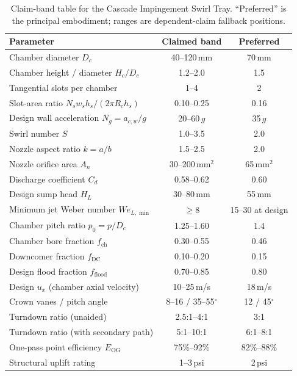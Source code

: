 \documentclass[11pt,letterpaper]{article}
\newcommand{\ux}{u_{x}}
\newcommand{\Eog}{E_{\mathrm{OG}}}
\newcommand{\Rc}{R_c}
\newcommand{\Hc}{H_c}
\newcommand{\Dc}{D_c}
\newcommand{\We}{\mathit{We}}
\begin{document}
\begin{table}[H]
\centering
\caption{Claim-band table for the Cascade Impingement Swirl Tray.
  ``Preferred'' is the principal embodiment; ranges are dependent-claim
  fallback positions.}
\label{tab:claimband}
\small
\begin{tabular}{lcc}
\toprule
Parameter & Claimed band & Preferred\\
\midrule
Chamber diameter $\Dc$              & 40--120\,mm        & 70\,mm\\
Chamber height / diameter $\Hc/\Dc$ & 1.2--2.0           & 1.5\\
Tangential slots per chamber        & 1--4               & 2\\
Slot-area ratio $N_s w_s h_s / (2\pi\Rc h_s)$ & 0.10--0.25 & 0.16\\
Design wall acceleration $N_g = a_{c,w}/g$      & 20--60\,$g$ & 35\,$g$\\
Swirl number $S$                    & 1.0--3.5           & 2.0\\
Nozzle aspect ratio $k = a/b$       & 1.5--2.5           & 2.0\\
Nozzle orifice area $A_n$           & 30--200\,mm$^2$    & 65\,mm$^2$\\
Discharge coefficient $C_d$         & 0.58--0.62         & 0.60\\
Design sump head $H_L$              & 30--80\,mm         & 55\,mm\\
Minimum jet Weber number $\We_{L,\min}$ & $\geq 8$      & 15--30 at design\\
Chamber pitch ratio $p_0 = p/\Dc$   & 1.25--1.60         & 1.4\\
Chamber bore fraction $f_{\mathrm{ch}}$ & 0.30--0.55  & 0.46\\
Downcomer fraction $f_{\mathrm{DC}}$ & 0.10--0.20       & 0.15\\
Design flood fraction $f_{\mathrm{flood}}$ & 0.70--0.85 & 0.80\\
Design $\ux$ (chamber axial velocity) & 10--25\,m/s    & 18\,m/s\\
Crown vanes / pitch angle           & 8--16 / 35--55\ensuremath{^\circ} & 12 / 45\ensuremath{^\circ}\\
Turndown ratio (unaided)            & 2.5:1--4:1         & 3:1\\
Turndown ratio (with secondary path)& 5:1--10:1          & 6:1--8:1\\
One-pass point efficiency $\Eog$    & 75\%--92\%         & 82\%--88\%\\
Structural uplift rating            & 1--3\,psi          & 2\,psi\\
\bottomrule
\end{tabular}
\end{table}
\end{document}
